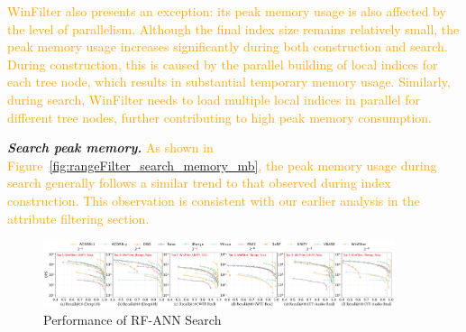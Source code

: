 \documentclass[sigconf, nonacm]{acmart}
\begin{document}
{	\textcolor{orange}{WinFilter also presents an exception:  its peak memory usage is also affected by the level of parallelism. Although the final index size remains relatively small, the peak memory usage increases significantly during both construction and search. During construction, this is caused by the parallel building of local indices for each tree node, which results in substantial temporary memory usage. Similarly, during search, WinFilter needs to load multiple local indices in parallel for different tree nodes, further contributing to high peak memory consumption.}
	

	
%	
%	


		\textit{\textbf{Search peak memory.}}  
		\textcolor{orange}{As shown in Figure~\ref{fig:rangeFilter_search_memory_mb}, the peak memory usage during search generally follows a similar trend to that observed during index construction. This observation is consistent with our earlier analysis in the attribute filtering section.}
		
	\begin{figure}[t]
		
		\centering
		
		\includegraphics[width=0.92\textwidth]{figures/exp/exp_8_2.pdf}
		\caption{Performance of RF-ANN Search}
		\label{fig:exp_8_2}
	\end{figure}
	
}
\end{document}
